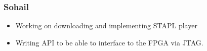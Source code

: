 \documentclass[11pt]{article}
\begin{document}
\subsubsection{Sohail}
\begin{itemize}
\item Working on downloading and implementing STAPL player
\item Writing API to be able to interface to the FPGA via JTAG. 
\end{itemize}





\end{document}
